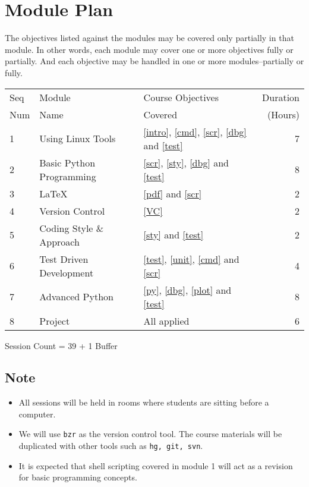 \documentclass{article}
\begin{document}
\section{Module Plan}
The objectives listed against the modules may be covered only partially in that module. In other words, each module may cover one or more objectives fully or partially. And each objective may be handled in one or more modules--partially or fully. 

\begin{tabular}{||l|l|l|r||}\hline\hline
Seq & Module  & Course Objectives & Duration\\
Num & Name    & Covered           & (Hours)\\\hline 
1 & Using Linux Tools        & \ref{intro}, \ref{cmd}, \ref{scr}, \ref{dbg} and  \ref{test} & 7\\\hline
2 & Basic Python Programming & \ref{scr}, \ref{sty}, \ref{dbg} and \ref{test}               & 8\\\hline 
3 & LaTeX                    & \ref{pdf} and \ref{scr}                                      & 2\\\hline
4 & Version Control          & \ref{VC}                                                     & 2\\\hline
5 & Coding Style \& Approach & \ref{sty} and \ref{test}                                     & 2\\\hline
6 & Test Driven Development  & \ref{test}, \ref{unit}, \ref{cmd} and \ref{scr}              & 4\\\hline
7 & Advanced Python          & \ref{py}, \ref{dbg}, \ref{plot} and \ref{test}               & 8\\\hline
8 & Project                  & All applied                                                  & 6\\\hline
\end{tabular}    

Session Count = 39 + 1 Buffer
\subsection*{Note}
\begin{itemize}
    \item All sessions will be held in rooms where students are sitting before a computer.
    \item We will use \texttt{bzr} as the version control tool. The course materials will be duplicated with other tools
          such as \texttt{hg, git, svn}.
    \item It is expected that shell scripting covered in module 1 will act as a revision for basic programming
      concepts.
\end{itemize}     
\end{document}
